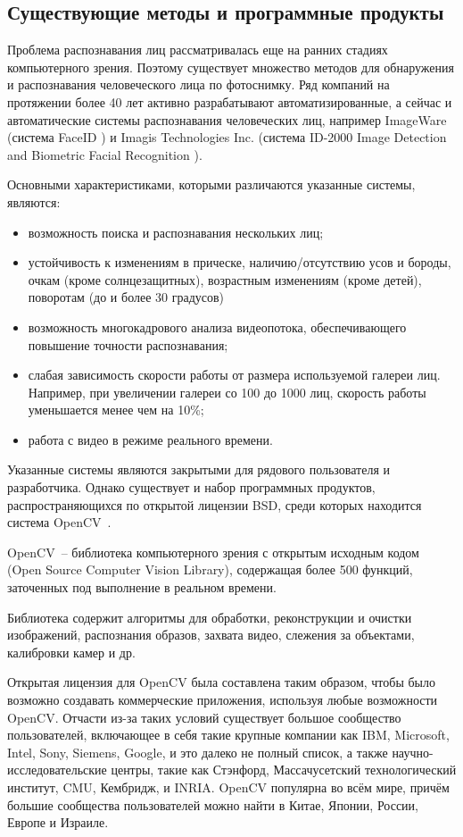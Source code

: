 \subsection{Существующие методы и программные продукты}

Проблема распознавания лиц рассматривалась еще на ранних
стадиях компьютерного зрения. Поэтому
существует множество методов для обнаружения и распознавания человеческого
лица по фотоснимку.
Ряд компаний на протяжении более 40 лет активно разрабатывают
автоматизированные, а сейчас и автоматические системы распознавания
человеческих лиц, например 
ImageWare (система FaceID \cite{faceid}) и Imagis Technologies Inc. (система
ID-2000 Image Detection and Biometric Facial Recognition \cite{imagis}).

Основными характеристиками, которыми различаются указанные системы, являются:
\begin{itemize}
    \item возможность поиска и распознавания нескольких лиц;
    \item устойчивость к изменениям в прическе, наличию/отсутствию усов
        и бороды, очкам (кроме солнцезащитных), возрастным
        изменениям (кроме детей), поворотам (до и более 30 градусов)
    \item возможность многокадрового анализа видеопотока,
        обеспечивающего повышение точности распознавания;
    \item слабая зависимость скорости работы от размера используемой
        галереи лиц. Например, при увеличении галереи со 100 до
        1000 лиц, скорость работы уменьшается менее чем на 10\%;
    \item работа с видео в режиме реального времени.
\end{itemize}

Указанные системы являются закрытыми для рядового пользователя и разработчика.
Однако существует и набор программных продуктов, распространяющихся по
открытой лицензии BSD, среди которых находится система OpenCV~\cite{opencv}.

OpenCV~-- библиотека компьютерного зрения с открытым исходным кодом
(Open Source Computer Vision Library), содержащая более 500
функций, заточенных под выполнение в реальном времени.

Библиотека содержит алгоритмы для обработки, реконструкции и
очистки изображений, распознания образов, захвата видео,
слежения за объектами, калибровки камер и др.

Открытая лицензия для OpenCV была составлена таким образом, чтобы было
возможно создавать коммерческие приложения, используя
любые возможности OpenCV. 
Отчасти из-за таких условий существует
большое сообщество пользователей, включающее в себя такие крупные
компании как IBM, Microsoft, Intel, Sony,
Siemens, Google, и это далеко не полный список, а также научно-исследовательские
центры, такие как Стэнфорд, Массачусетский технологический
институт, CMU, Кембридж, и INRIA. OpenCV популярна во всём мире,
причём большие сообщества пользователей можно найти в Китае,
Японии, России, Европе и Израиле.

